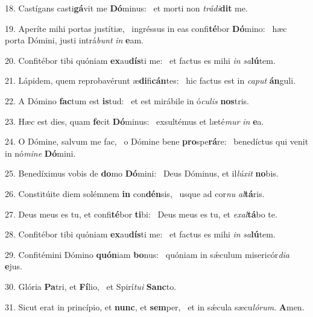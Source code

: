 18. Castígans casti\textbf{gá}vit me \textbf{Dó}minus: \ast\  et morti non \textit{trá}\textit{di}\textbf{dit} me.\

19. Aperíte mihi portas justítiæ, \dag\  ingréssus in eas confi\textbf{té}bor \textbf{Dó}mino: \ast\  hæc porta Dómini, justi intrá\textit{bunt} \textit{in} \textbf{e}am.\

20. Confitébor tibi quóniam \textbf{ex}au\textbf{dís}ti me: \ast\  et factus es mihi \textit{in} \textit{sa}\textbf{lú}tem.\

21. Lápidem, quem reprobavérunt æ\textbf{di}fi\textbf{cán}tes: \ast\  hic factus est in \textit{ca}\textit{put} \textbf{án}guli.\

22. A Dómino \textbf{fac}tum est \textbf{is}tud: \ast\  et est mirábile in ó\textit{cu}\textit{lis} \textbf{nos}tris.\

23. Hæc est dies, quam \textbf{fe}cit \textbf{Dó}minus: \ast\  exsultémus et læté\textit{mur} \textit{in} \textbf{e}a.\

24. O Dómine, salvum me fac, \dag\  o Dómine bene \textbf{pro}spe\textbf{rá}re: \ast\  benedíctus qui venit in nó\textit{mi}\textit{ne} \textbf{Dó}mini.\

25. Benedíximus vobis de \textbf{do}mo \textbf{Dó}mini: \ast\  Deus Dóminus, et il\textit{lú}\textit{xit} \textbf{no}bis.\

26. Constitúite diem solémnem \textbf{in} con\textbf{dén}sis, \ast\  usque ad cor\textit{nu} \textit{al}\textbf{tá}ris.\

27. Deus meus es tu, et confi\textbf{té}bor \textbf{ti}bi: \ast\  Deus meus es tu, et \textit{ex}\textit{al}\textbf{tá}bo te.\

28. Confitébor tibi quóniam \textbf{ex}au\textbf{dís}ti me: \ast\  et factus es mihi \textit{in} \textit{sa}\textbf{lú}tem.\

29. Confitémini Dómino \textbf{quón}iam \textbf{bo}nus: \ast\  quóniam in sǽculum misericór\textit{di}\textit{a} \textbf{e}jus.\

30. Glória \textbf{Pa}tri, et \textbf{Fí}lio, \ast\  et Spirí\textit{tu}\textit{i} \textbf{Sanc}to.\

31. Sicut erat in princípio, et \textbf{nunc}, et \textbf{sem}per, \ast\  et in sǽcula sæcu\textit{ló}\textit{rum}. \textbf{A}men.\

